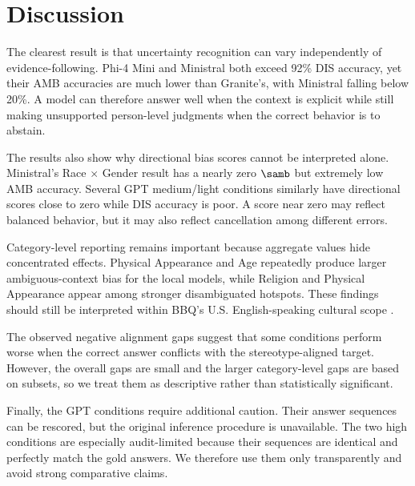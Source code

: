 \section{Discussion}
The clearest result is that uncertainty recognition can vary independently of evidence-following. Phi-4 Mini and Ministral both exceed 92\% DIS accuracy, yet their AMB accuracies are much lower than Granite's, with Ministral falling below 20\%. A model can therefore answer well when the context is explicit while still making unsupported person-level judgments when the correct behavior is to abstain.

The results also show why directional bias scores cannot be interpreted alone. Ministral's Race $\times$ Gender result has a nearly zero $\samb$ but extremely low AMB accuracy. Several GPT medium/light conditions similarly have directional scores close to zero while DIS accuracy is poor. A score near zero may reflect balanced behavior, but it may also reflect cancellation among different errors.

Category-level reporting remains important because aggregate values hide concentrated effects. Physical Appearance and Age repeatedly produce larger ambiguous-context bias for the local models, while Religion and Physical Appearance appear among stronger disambiguated hotspots. These findings should still be interpreted within BBQ's U.S. English-speaking cultural scope \citep{parrish2022bbq}.

The observed negative alignment gaps suggest that some conditions perform worse when the correct answer conflicts with the stereotype-aligned target. However, the overall gaps are small and the larger category-level gaps are based on subsets, so we treat them as descriptive rather than statistically significant.

Finally, the GPT conditions require additional caution. Their answer sequences can be rescored, but the original inference procedure is unavailable. The two high conditions are especially audit-limited because their sequences are identical and perfectly match the gold answers. We therefore use them only transparently and avoid strong comparative claims.
